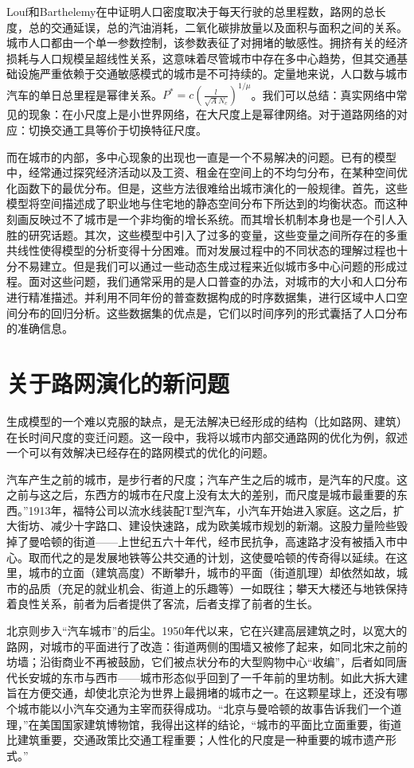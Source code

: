 Louf和Barthelemy在\cite{Louf2014}中证明人口密度取决于每天行驶的总里程数，路网的总长度，总的交通延误，总的汽油消耗，二氧化碳排放量以及面积与面积之间的关系。城市人口都由一个单一参数控制，该参数表征了对拥堵的敏感性。拥挤有关的经济损耗与人口规模呈超线性关系，这意味着尽管城市中存在多中心趋势，但其交通基础设施严重依赖于交通敏感模式的城市是不可持续的。定量地来说，人口数与城市汽车的单日总里程是幂律关系。$P^*=c(\frac{l}{\sqrt{A}N_c})^{1/\mu}$。我们可以总结：真实网络中常见的现象：在小尺度上是小世界网络，在大尺度上是幂律网络。对于道路网络的对应：切换交通工具等价于切换特征尺度。

而在城市的内部，多中心现象的出现也一直是一个不易解决的问题。已有的模型中，经常通过探究经济活动以及工资、租金在空间上的不均匀分布，在某种空间优化函数下的最优分布。但是，这些方法很难给出城市演化的一般规律。首先，这些模型将空间描述成了职业地与住宅地的静态空间分布下所达到的均衡状态。而这种刻画反映过不了城市是一个非均衡的增长系统。而其增长机制本身也是一个引人入胜的研究话题。其次，这些模型中引入了过多的变量，这些变量之间所存在的多重共线性使得模型的分析变得十分困难。而对发展过程中的不同状态的理解过程也十分不易建立。但是我们可以通过一些动态生成过程来近似城市多中心问题的形成过程。面对这些问题，我们通常采用的是人口普查的办法，对城市的大小和人口分布进行精准描述。并利用不同年份的普查数据构成的时序数据集，进行区域中人口空间分布的回归分析。这些数据集的优点是，它们以时间序列的形式囊括了人口分布的准确信息。


\section{关于路网演化的新问题}

生成模型的一个难以克服的缺点，是无法解决已经形成的结构（比如路网、建筑）在长时间尺度的变迁问题。这一段中，我将以城市内部交通路网的优化为例，叙述一个可以有效解决已经存在的路网模式的优化的问题。

汽车产生之前的城市，是步行者的尺度；汽车产生之后的城市，是汽车的尺度。这之前与这之后，东西方的城市在尺度上没有太大的差别，而尺度是城市最重要的东西。”1913年，福特公司以流水线装配T型汽车，小汽车开始进入家庭。这之后，扩大街坊、减少十字路口、建设快速路，成为欧美城市规划的新潮。这股力量险些毁掉了曼哈顿的街道——上世纪五六十年代，经市民抗争，高速路才没有被插入市中心。取而代之的是发展地铁等公共交通的计划，这使曼哈顿的传奇得以延续。在这里，城市的立面（建筑高度）不断攀升，城市的平面（街道肌理）却依然如故，城市的品质（充足的就业机会、街道上的乐趣等）一如既往；攀天大楼还与地铁保持着良性关系，前者为后者提供了客流，后者支撑了前者的生长。

北京则步入“汽车城市”的后尘。1950年代以来，它在兴建高层建筑之时，以宽大的路网，对城市的平面进行了改造：街道两侧的围墙又被修了起来，如同北宋之前的坊墙；沿街商业不再被鼓励，它们被点状分布的大型购物中心“收编”，后者如同唐代长安城的东市与西市——城市形态似乎回到了一千年前的里坊制。如此大拆大建旨在方便交通，却使北京沦为世界上最拥堵的城市之一。在这颗星球上，还没有哪个城市能以小汽车交通为主宰而获得成功。“北京与曼哈顿的故事告诉我们一个道理，”在美国国家建筑博物馆，我得出这样的结论，“城市的平面比立面重要，街道比建筑重要，交通政策比交通工程重要；人性化的尺度是一种重要的城市遗产形式。” 

